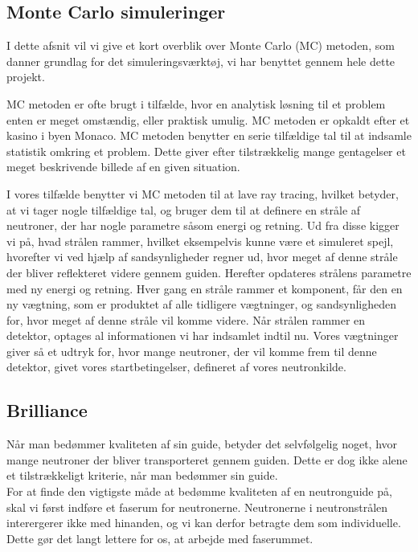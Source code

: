 \documentclass[12pt,oneside,a4paper]{article}
\begin{document}
{{{{{\subsection{Monte Carlo simuleringer}
I dette afsnit vil vi give et kort overblik over Monte Carlo (MC) metoden, som danner grundlag for det simuleringsværktøj, vi har benyttet gennem hele dette projekt.

MC metoden er ofte brugt i tilfælde, hvor en analytisk løsning til et problem enten er meget omstændig, eller praktisk umulig. MC metoden er opkaldt efter et kasino i byen Monaco. MC metoden benytter en serie tilfældige tal til at indsamle statistik omkring et problem. Dette giver efter tilstrækkelig mange gentagelser et meget beskrivende billede af en given situation.

I vores tilfælde benytter vi MC metoden til at lave ray tracing, hvilket betyder, at vi tager nogle tilfældige tal, og bruger dem til at definere en stråle af neutroner, der har nogle parametre såsom energi og retning.
Ud fra disse  kigger vi på, hvad strålen rammer, hvilket eksempelvis kunne være et simuleret spejl, hvorefter vi ved hjælp af sandsynligheder regner ud, hvor meget af denne stråle der bliver reflekteret videre gennem guiden. Herefter opdateres strålens parametre med ny energi og retning.
Hver gang en stråle rammer et komponent, får den en ny vægtning, som er produktet af alle tidligere vægtninger, og sandsynligheden for, hvor meget af denne stråle vil komme videre.
Når strålen rammer en detektor, optages al informationen vi har indsamlet indtil nu. Vores vægtninger giver så et udtryk for, hvor mange neutroner, der vil komme frem til denne detektor, givet vores startbetingelser, defineret af vores neutronkilde. \cite{wiki:monte_carlo}

\subsection{Brilliance}

Når man bedømmer kvaliteten af sin guide, betyder det selvfølgelig noget, hvor mange neutroner der bliver transporteret gennem guiden. Dette er dog ikke alene et tilstrækkeligt kriterie, når man bedømmer sin guide. 
\\


For at finde den vigtigste måde at bedømme kvaliteten af en neutronguide på, skal vi først indføre et faserum for neutronerne. Neutronerne i neutronstrålen interergerer ikke med hinanden, og vi kan derfor betragte dem som individuelle. Dette gør det langt lettere for os, at arbejde med faserummet. 
\\


}}}}}
\end{document}

